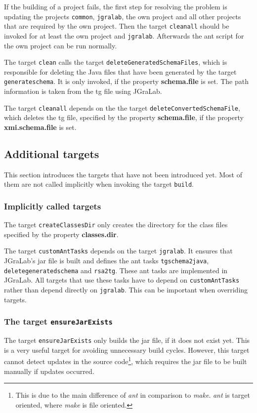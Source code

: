 \documentclass[a4paper,twoside,11pt,bibtotoc]{article}
\begin{document}
If the building of a project fails, the first step for resolving the problem is updating the projects \texttt{common}, \texttt{jgralab}, the own project and all other projects that are required by the own project.
Then the target \texttt{cleanall} should be invoked for at least the own project and \texttt{jgralab}.
Afterwards the ant script for the own project can be run normally.

The target \texttt{clean} calls the target \texttt{deleteGeneratedSchemaFiles}, which is responsible for deleting the Java files that have been generated by the target \texttt{generateschema}.
It is only invoked, if the property \textbf{schema.file} is set.
The path information is taken from the tg file using JGraLab.

The target \texttt{cleanall} depends on the the target \texttt{deleteConvertedSchemaFile}, which deletes the tg file, specified by the property \textbf{schema.file}, if the property \textbf{xmi.schema.file} is set.


\subsection{Additional targets}
\label{sec:additional}
This section introduces the targets that have not been introduced yet. Most of them are not called implicitly when invoking the target \texttt{build}.

\subsubsection{Implicitly called targets}
The target \texttt{createClassesDir} only creates the directory for the class files specified by the property \textbf{classes.dir}.

The target \texttt{customAntTasks} depends on the target \texttt{jgralab}.
It ensures that JGraLab's jar file is built and defines the ant tasks \texttt{tgschema2java}, \texttt{deletegeneratedschema} and \texttt{rsa2tg}.
These ant tasks are implemented in JGraLab.
All targets that use these tasks have to depend on \texttt{customAntTasks} rather than depend directly on \texttt{jgralab}.
This can be important when overriding targets.

\subsubsection{The target \texttt{ensureJarExists}}
The target \texttt{ensureJarExists} only builds the jar file, if it does not exist yet.
This is a very useful target for avoiding unnecessary build cycles.
However, this target cannot detect updates in the source code\footnote{This is due to the main difference of \emph{ant} in comparison to \emph{make}. \emph{ant} is target oriented, where \emph{make} is file oriented.}, which requires the jar file to be built manually if updates occurred.
\end{document}
